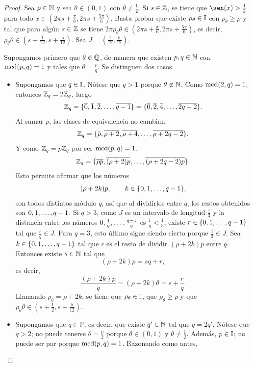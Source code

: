 \documentclass[a4paper, 12pt, oneside]{book}
\begin{document}
\begin{proof}
    Sea $\rho\in \mathbb N$ y sea $\theta \in (0,1)$ con $\theta\neq\frac{1}{2}$. Si $s \in \mathbb Z$, se tiene que $\sen(x) > \frac{1}{2}$ para todo $x \in (2\pi s+\frac{\pi}{6},2\pi s+\frac{5\pi}{6})$. Basta probar que existe $\rho_\theta \in \mathbb I$ con $\rho_\theta \geq \rho$ y tal que para algún $s \in \mathbb Z$ se tiene $2\pi\rho_\theta\theta \in (2\pi s +\frac{\pi}{6},2\pi s +\frac{5\pi}{6})$, es decir, $\rho_\theta\theta \in (s+\frac{1}{12},s+\frac{5}{12})$. Sea $J=(\frac{1}{12},\frac{5}{12})$.

    Supongamos primero que $\theta \in \mathbb Q$, de manera que existen $p,q \in \mathbb N$ con $\textup{mcd}(p,q) = 1$ y tales que $\theta = \frac{p}{q}$. Se distinguen dos casos.
    \begin{itemize}
        \item Supongamos que $q \in \mathbb I$. Nótese que $q > 1$ porque $\theta \not\in\mathbb N$. Como $\textup{mcd}(2,q) = 1$, entonces $\mathbb Z_q = 2\mathbb Z_q$, luego
        \[\mathbb Z_q = \{\overline{0},\overline{1},\overline{2},\mathellipsis,\overline{q-1}\} = \{\overline{0},\overline{2},\overline{4},\mathellipsis,\overline{2q-2}\}.\]
        Al sumar $\rho$, las clases de equivalencia no cambian:
        \[\mathbb Z_q= \{\overline{\rho},\overline{\rho+2},\overline{\rho+4},\mathellipsis,\overline{\rho+2q-2}\}.\]
        Y como $\mathbb Z_q = p\mathbb Z_q$ por ser $\textup{mcd}(p,q) = 1$,
        \[\mathbb Z_q = \{\overline{\rho p},\overline{(\rho+2)p},\mathellipsis,\overline{(\rho+2q-2)p}\}.\]
        Esto permite afirmar que los números 
        \[(\rho+2k)p, \qquad k \in \{0,1,\mathellipsis,q-1\},\]
        son todos distintos módulo $q$, así que al dividirlos entre $q$, los restos obtenidos son $0,1,\mathellipsis,q-1$. Si $q > 3$, como $J$ es un intervalo de longitud $\frac{1}{3}$ y la distancia entre los números $0,\frac{1}{q},\mathellipsis,\frac{q-1}{q}$ es $\frac{1}{q} < \frac{1}{3}$, existe $r \in \{0,1,\mathellipsis,q-1\}$ tal que $\frac{r}{q} \in J$. Para $q = 3$, esto último sigue siendo cierto porque $\frac{1}{3} \in J$. Sea $k \in \{0,1,\mathellipsis,q-1\}$ tal que $r$ es el resto de dividir $(\rho+2k)p$ entre $q$. Entonces existe $s \in \mathbb N$ tal que
        \[(\rho+2k)p = sq + r,\]
        es decir,
        \[\frac{(\rho+2k)p}{q} = (\rho+2k)\theta = s + \frac{r}{q}.\]
        Llamando $\rho_\theta = \rho+2k$, se tiene que $\rho_\theta \in \mathbb I$, que $\rho_\theta \geq \rho$ y que $\rho_\theta\theta \in (s+\frac{1}{2},s+\frac{5}{12})$.
        \item Supongamos que $q \in \mathbb{P}$, es decir, que existe $q'\in\mathbb N$ tal que $q = 2q'$. Nótese que $q > 2$; no puede tenerse $\theta = \frac{p}{2}$ porque $\theta \in (0,1)$ y $\theta \neq \frac{1}{2}$. Además, $p \in \mathbb I$; no puede ser par porque $\textup{mcd}(p,q) = 1$. Razonando como antes,

\end{itemize}
\end{proof}
\end{document}

